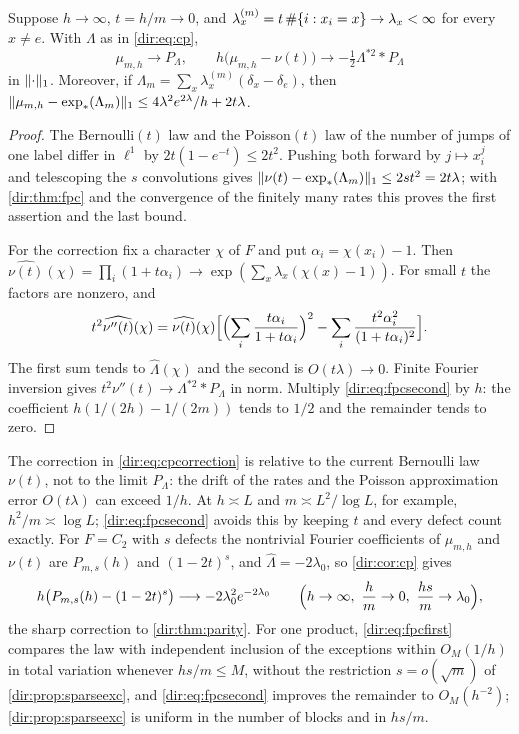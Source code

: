 \begin{corollary}\label{dir:cor:cp}
Suppose $h\to\infty$, $t=h/m\to0$, and $\lambda_x^{(m)}=t\,\#\{i:x_i=x\}\to\lambda_x<\infty$ for every
$x\ne e$. With $\Lambda$ as in \eqref{dir:eq:cp},
\begin{equation}\label{dir:eq:cpcorrection}
 \mu_{m,h}\longrightarrow P_\Lambda,\qquad h\bigl(\mu_{m,h}-\nu(t)\bigr)\longrightarrow-\tfrac12\Lambda^{*2}*P_\Lambda
\end{equation}
in $\lVert\cdot\rVert_1$. Moreover, if $\Lambda_m=\sum_x\lambda_x^{(m)}(\delta_x-\delta_e)$, then
$\lVert\mu_{m,h}-\exp_*(\Lambda_m)\rVert_1\le4\lambda^2e^{2\lambda}/h+2t\lambda$.
\end{corollary}

\begin{proof}
The Bernoulli$(t)$ law and the Poisson$(t)$ law of the number of jumps of one label differ in $\ell^1$ by
$2t(1-e^{-t})\le2t^2$. Pushing both forward by $j\mapsto x_i^j$ and telescoping the $s$ convolutions gives
$\lVert\nu(t)-\exp_*(\Lambda_m)\rVert_1\le2st^2=2t\lambda$; with \cref{dir:thm:fpc} and the convergence of the
finitely many rates this proves the first assertion and the last bound.

For the correction fix a character $\chi$ of $F$ and put $\alpha_i=\chi(x_i)-1$. Then
$\widehat{\nu(t)}(\chi)=\prod_i(1+t\alpha_i)\to\exp(\sum_x\lambda_x(\chi(x)-1))$. For small $t$ the
factors are nonzero, and
\[
 t^2\widehat{\nu''(t)}(\chi)=\widehat{\nu(t)}(\chi)\Bigl[\Bigl(\sum_i\frac{t\alpha_i}{1+t\alpha_i}\Bigr)^2
 -\sum_i\frac{t^2\alpha_i^2}{(1+t\alpha_i)^2}\Bigr].
\]
The first sum tends to $\widehat\Lambda(\chi)$ and the second is $O(t\lambda)\to0$. Finite Fourier
inversion gives $t^2\nu''(t)\to\Lambda^{*2}*P_\Lambda$ in norm. Multiply \eqref{dir:eq:fpcsecond} by $h$:
the coefficient $h(1/(2h)-1/(2m))$ tends to $1/2$ and the remainder tends to zero.
\end{proof}

The correction in \eqref{dir:eq:cpcorrection} is relative to the current Bernoulli law $\nu(t)$, not to
the limit $P_\Lambda$: the drift of the rates and the Poisson approximation error $O(t\lambda)$ can exceed
$1/h$. At $h\asymp L$ and $m\asymp L^2/\log L$, for example, $h^2/m\asymp\log L$; \eqref{dir:eq:fpcsecond}
avoids this by keeping $t$ and every defect count exactly. For $F=C_2$ with $s$ defects the nontrivial
Fourier coefficients of $\mu_{m,h}$ and $\nu(t)$ are $P_{m,s}(h)$ and $(1-2t)^s$, and $\widehat\Lambda=-2\lambda_0$,
so \cref{dir:cor:cp} gives
\begin{equation}\label{dir:eq:paritylimit}
 h\bigl(P_{m,s}(h)-(1-2t)^s\bigr)\longrightarrow-2\lambda_0^2e^{-2\lambda_0}
 \qquad\Bigl(h\to\infty,\ \frac hm\to0,\ \frac{hs}m\to\lambda_0\Bigr),
\end{equation}
the sharp correction to \cref{dir:thm:parity}. For one product, \eqref{dir:eq:fpcfirst} compares the
law with independent inclusion of the exceptions within $O_M(1/h)$ in total variation whenever
$hs/m\le M$, without the restriction $s=o(\sqrt m)$ of \cref{dir:prop:sparseexc}, and
\eqref{dir:eq:fpcsecond} improves the remainder to $O_M(h^{-2})$; \cref{dir:prop:sparseexc} is uniform in
the number of blocks and in $hs/m$.

